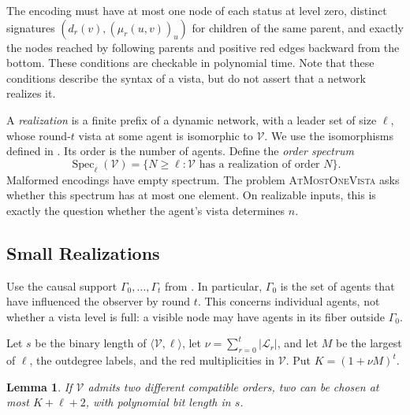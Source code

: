 \documentclass[11pt]{article}
\newtheorem{lemma}{Lemma}
\begin{document}
The encoding must have at most one node of each status at level zero,
distinct signatures \((d_r(v),(\mu_r(u,v))_u)\) for children of the
same parent, and exactly the nodes reached by following parents and
positive red edges backward from the bottom.  These conditions are
checkable in polynomial time. Note that these conditions describe the syntax of a vista, but do not assert that a network realizes it.

A \emph{realization} is a finite prefix of a dynamic network, with a
leader set of size \(\ell\), whose round-\(t\) vista at some agent
is isomorphic to \(\mathcal V\).  We use the isomorphisms defined in
.  Its order is the number of agents.  Define the
\emph{order spectrum}
\[
 \operatorname{Spec}_{\ell}(\mathcal V)
 =\{N\geq\ell:\mathcal V\text{ has a realization of order }N\}.
\]
Malformed encodings have empty spectrum.  The problem
\textsc{AtMostOneVista} asks whether this spectrum has at most one
element.  On realizable inputs, this is exactly the question whether
the agent's vista determines \(n\).

\subsection{Small Realizations}

Use the causal support \(\Gamma_0,\ldots,\Gamma_t\) from
.  In particular, \(\Gamma_0\) is the set of
agents that have influenced the observer by round \(t\).
This concerns individual agents, not whether a vista level is full: a visible node may have agents in its fiber outside
\(\Gamma_0\).

Let \(s\) be the binary length of \(\langle\mathcal V,\ell\rangle\),
let \(\nu=\sum_{r=0}^t|\mathcal L_r|\), and let \(M\) be the
largest of \(\ell\), the outdegree labels, and the red
multiplicities in \(\mathcal V\).  Put \(K=(1+\nu M)^t\).

\begin{lemma}
\label{lem:conp-bounded-orders}
If \(\mathcal V\) admits two different compatible orders, two
can be chosen at most \(K+\ell+2\), with polynomial bit length
in \(s\).
\end{lemma}
\end{document}
